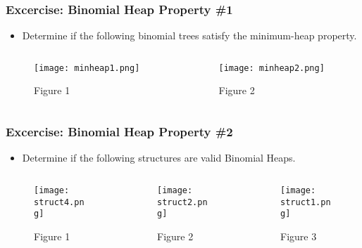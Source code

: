 \documentclass[13pt]{beamer}
\begin{document}
\begin{frame}
\frametitle{Excercise: Binomial Heap Property \#1}
  \begin{itemize}
    \item Determine if the following binomial trees satisfy the minimum-heap property.
  \end{itemize}

  \begin{columns}[T] %
    \begin{column}[T]{6.5cm} %
      \begin{figure}
        \caption{Figure 1}
        \texttt{[image: minheap1.png]}
      \end{figure}
      \centering
    \end{column}
    \begin{column}[T]{6.5cm} %
      \begin{figure}
        \caption{Figure 2}
        \texttt{[image: minheap2.png]}
      \end{figure}
    \end{column}
  \end{columns}
\end{frame}

\begin{frame}
\frametitle{Excercise: Binomial Heap Property \#2}
  \begin{itemize}
    \item Determine if the following structures are valid Binomial Heaps.
  \end{itemize}

  \begin{columns}[T] %
    \begin{column}[T]{4.3cm} %
      \begin{figure}
        \caption{Figure 1}
        \texttt{[image: struct4.png]}
      \end{figure}
      \centering
    \end{column}
    \begin{column}[T]{4.3cm} %
      \begin{figure}
        \caption{Figure 2}
        \texttt{[image: struct2.png]}
      \end{figure}
    \end{column}
    \begin{column}[T]{4.3cm} %
      \begin{figure}
        \caption{Figure 3}
        \texttt{[image: struct1.png]}
      \end{figure}
    \end{column}
  \end{columns}

\end{frame}
\end{document}
